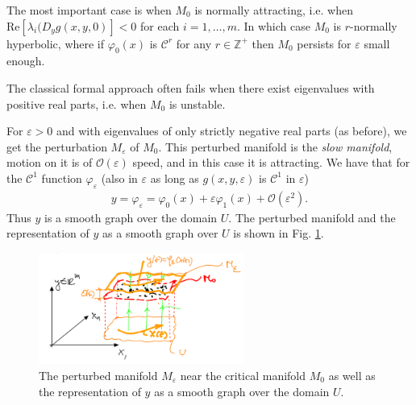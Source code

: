 The most important case is when $M_0$ is normally attracting, i.e. when $ \textrm{Re} [\lambda_i(D_{y}g(x,y,0) ] < 0$ for each $i=1,\ldots, m$.  In which case $M_0$ is $r$-normally hyperbolic, where if $\varphi_0(x)$ is $\mathcal{C}^{r}$ for any $r\in \mathbb{Z}^{+}$ then $M_0$ persists for $\varepsilon$ small enough. 

The classical formal approach often fails when there exist eigenvalues with positive real parts, i.e. when $M_0$ is unstable.

For $\varepsilon>0$ and with eigenvalues of only strictly negative real parts (as before), we get the perturbation $M_\varepsilon$ of $M_0$. This perturbed manifold is the \emph{slow manifold}, motion on it is of $\mathcal{O}(\varepsilon)$ speed, and in this case it is attracting. We have that for the $\mathcal{C}^{1}$ function $\varphi_{\varepsilon}$ (also in $\varepsilon$ as long as $g(x,y,\varepsilon)$ is $\mathcal{C}^{1}$ in $\varepsilon$)
\begin{align}
	y = \varphi_{\varepsilon}= \varphi_0(x) + \varepsilon \varphi_1(x) + \mathcal{O}(\varepsilon^{2}).
\end{align}
Thus $y$ is a smooth graph over the domain $U$. The perturbed manifold and the representation of $y$ as a smooth graph over $U$ is shown in Fig. \ref{fig:singular_perturbed_mfd}.
\begin{figure}[h!]
	\centering
	\includegraphics[width=0.6\textwidth]{figures/ch9/18singular_pert_mfd.png}
	\caption{The perturbed manifold $M_{\varepsilon}$ near the critical manifold $M_0$ as well as the representation of $y$ as a smooth graph over the domain $U$.}
	\label{fig:singular_perturbed_mfd}
\end{figure}

